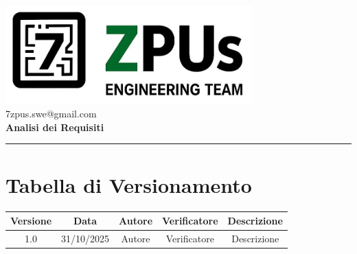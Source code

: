 \documentclass[a4paper,12pt]{article}
\begin{document}
\begin{center}
    \includegraphics[width=9.5cm]{../assets/logo7ZPUs.jpg}\\
    \small\hspace{10cm} 7zpus.swe@gmail.com\\
    \vspace{0.5cm}
    \Large \textbf{Analisi dei Requisiti}\\
\end{center}

\vspace{0.3cm}
\hrule
\vspace{0.5cm}

\tableofcontents

\newpage

\section*{Tabella di Versionamento}
\begin{tabular}{|c|c|c|c|c|}
    \hline
    \textbf{Versione} & \textbf{Data} & \textbf{Autore}  & \textbf{Verificatore} & \textbf{Descrizione} \\
    \hline
    1.0 & 31/10/2025 & Autore & Verificatore & Descrizione \\
    \hline

\end{tabular}
\end{document}
